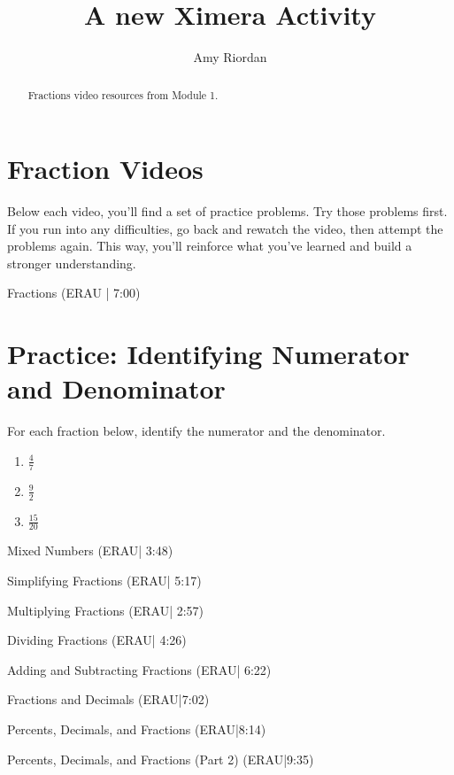 \documentclass{ximera}
\title{A new Ximera Activity}
\author{Amy Riordan}
\begin{document}
\begin{abstract}
Fractions video resources from Module 1.
\end{abstract}
\maketitle

\section*{Fraction Videos}

Below each video, you’ll find a set of practice problems. Try those problems first. If you run into any difficulties, go back and rewatch the video, then attempt the problems again. This way, you’ll reinforce what you’ve learned and build a stronger understanding.

Fractions (ERAU | 7:00)



\section*{Practice: Identifying Numerator and Denominator}

For each fraction below, identify the numerator and the denominator.

\begin{enumerate}
    \item $\frac{4}{7}$
    \item $\frac{9}{2}$
    \item $\frac{15}{20}$
\end{enumerate}


Mixed Numbers (ERAU| 3:48)


Simplifying Fractions (ERAU| 5:17)


Multiplying Fractions (ERAU| 2:57)


Dividing Fractions (ERAU| 4:26)


Adding and Subtracting Fractions (ERAU| 6:22)


Fractions and Decimals (ERAU|7:02)


Percents, Decimals, and Fractions (ERAU|8:14)


Percents, Decimals, and Fractions (Part 2) (ERAU|9:35)

\end{document}

